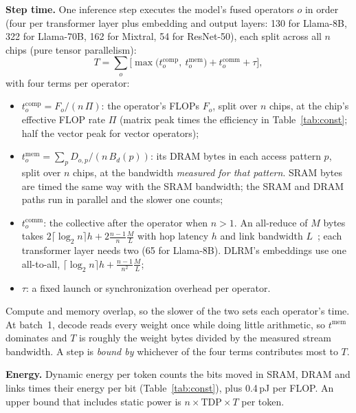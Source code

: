 \documentclass[12pt]{article}
\begin{document}
\textbf{Step time.} One inference step executes the model's fused operators $o$ in order (four per transformer layer plus embedding and output layers: 130 for Llama-8B, 322 for Llama-70B, 162 for Mixtral, 54 for ResNet-50), each split across all $n$ chips (pure tensor parallelism):
\begin{equation}
T = \sum_{o} \Big[\max\big(t^{\mathrm{comp}}_o,\ t^{\mathrm{mem}}_o\big) + t^{\mathrm{comm}}_o + \tau\Big],\label{eq:step}
\end{equation}
with four terms per operator:
\begin{itemize}
\item $t^{\mathrm{comp}}_o = F_o/(n\,\Pi)$: the operator's FLOPs $F_o$, split over $n$ chips, at the chip's effective FLOP rate $\Pi$ (matrix peak times the efficiency in Table~\ref{tab:const}; half the vector peak for vector operators);
\item $t^{\mathrm{mem}}_o = \sum_p D_{o,p}/(n\,B_d(p))$: its DRAM bytes in each access pattern $p$, split over $n$ chips, at the bandwidth \emph{measured for that pattern}. SRAM bytes are timed the same way with the SRAM bandwidth; the SRAM and DRAM paths run in parallel and the slower one counts;
\item $t^{\mathrm{comm}}_o$: the collective after the operator when $n>1$. An all-reduce of $M$ bytes takes $2\lceil\log_2 n\rceil h + 2\frac{n-1}{n}\frac{M}{L}$ with hop latency $h$ and link bandwidth $L$~\cite{thakur2005}; each transformer layer needs two (65 for Llama-8B). DLRM's embeddings use one all-to-all, $\lceil\log_2 n\rceil h + \frac{n-1}{n^2}\frac{M}{L}$;
\item $\tau$: a fixed launch or synchronization overhead per operator.
\end{itemize}
Compute and memory overlap, so the slower of the two sets each operator's time. At batch~1, decode reads every weight once while doing little arithmetic, so $t^{\mathrm{mem}}$ dominates and $T$ is roughly the weight bytes divided by the measured stream bandwidth. A step is \emph{bound by} whichever of the four terms contributes most to $T$.

\textbf{Energy.} Dynamic energy per token counts the bits moved in SRAM, DRAM and links times their energy per bit (Table~\ref{tab:const}), plus 0.4\,pJ per FLOP. An upper bound that includes static power is $n\times\mathrm{TDP}\times T$ per token.
\end{document}
